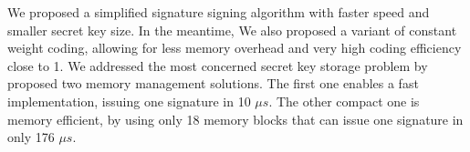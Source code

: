 \documentclass[10pt,journal,compsoc]{IEEEtran}
\begin{document}
We proposed a simplified signature signing algorithm with faster speed and smaller secret key size.
In the meantime, We also proposed a variant of constant weight coding, allowing for less memory overhead and very high coding efficiency close to 1. We addressed the most concerned secret key storage problem by proposed two memory management solutions. The first one enables a fast implementation, issuing one signature in 10 $\mu s$. The other compact one is memory efficient, by using only 18 memory blocks that can issue one signature in only 176 $\mu s$.



\end{document}
